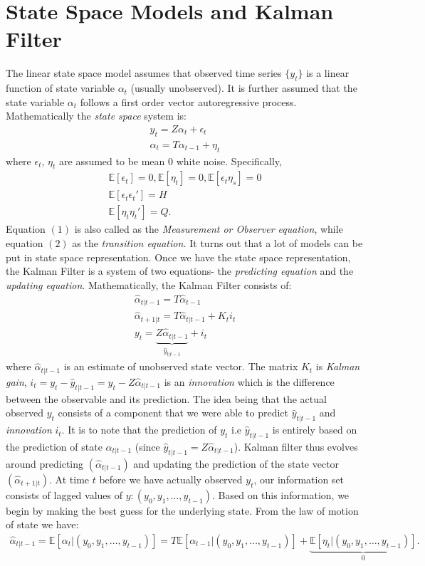 \documentclass[12pt]{article}
\begin{document}
\section{State Space Models and Kalman Filter}
The linear state space model assumes that observed time series $\{y_t\}$ is a linear function of state variable $\alpha_t$ (usually unobserved). It is further assumed that the state variable $\alpha_t$ follows a first order vector autoregressive process. Mathematically the \textit{state space} system is:
\begin{align}
y_t = Z\alpha_t + \epsilon_t \\
\alpha_t = T \alpha_{t-1} + \eta_t
\end{align}
where $\epsilon_t$, $\eta_t$ are assumed to be mean $0$ white noise. Specifically,
\begin{gather*}
\mathbb{E}[\epsilon_t] =0, \mathbb{E}[\eta_t] =0, \mathbb{E}[\epsilon_t \eta_s]=0\\
\mathbb{E}[\epsilon_t \epsilon_t'] = H \\
\mathbb{E}[\eta_t \eta_t'] = Q.
\end{gather*}
Equation $(1)$ is also called as the \textit{Measurement or Observer equation}, while equation $(2)$ as the \textit{transition equation.} It turns out that a lot of models can be put in state space representation. Once we have the state space representation, the Kalman Filter is a system of two equations- the \textit{predicting equation} and the \textit{updating equation}. Mathematically, the Kalman Filter consists of:
\begin{align}
\hat{\alpha}_{t|t-1} = T \hat{\alpha}_{t-1}\\
\hat{\alpha}_{t+1|t} = T \hat{\alpha}_{t|t-1} + K_t i_t \\
y_t = \underbrace{Z \hat{\alpha}_{t|t-1}}_{\hat{y}_{t|t-1}} + i_t
\end{align}
where $\hat{\alpha}_{t|t-1}$ is an estimate of unobserved state vector. The matrix $K_t$ is \textit{Kalman gain}, $i_t = y_t - \hat{y}_{t|t-1} = y_t - Z \hat{\alpha}_{t|t-1} $ is an \textit{innovation} which is the difference between the observable and its prediction. The idea being that the actual observed $y_t$ consists of a component that we were able to predict $\hat{y}_{t|t-1}$ and \textit{innovation} $i_t$. It is to note that the prediction of $y_t$ i.e $\hat{y}_{t|t-1}$ is entirely based on the prediction of state $\hat{\alpha}_{t|t-1}$ (since $\hat{y}_{t|t-1} = Z \hat{\alpha}_{t|t-1}$). Kalman filter thus evolves around predicting $(\hat{\alpha}_{t|t-1})$  and updating the prediction of the state vector$(\hat{\alpha}_{t+1|t}).$ At time $t$ before we have actually observed $y_t$, our information set consists of lagged values of $y: (y_0, y_1, \dots, y_{t-1}).$ Based on this information, we begin by making the best guess for the underlying state. From the law of motion of state we have:
\begin{align*}
\hat{\alpha}_{t|t-1} = \mathbb{E}[\alpha_t | (y_0, y_1, \dots, y_{t-1}) ] = T\mathbb{E}[\alpha_{t-1}|(y_0, y_1, \dots, y_{t-1})] + \underbrace{\mathbb{E}[\eta_t|(y_0, y_1, \dots, y_{t-1})]}_{0}.
\end{align*}
\end{document}

